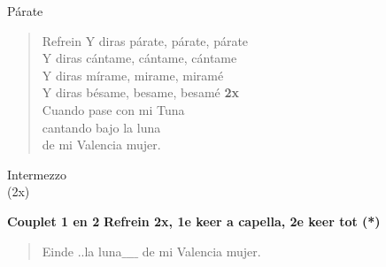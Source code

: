 \begin{song}{Párate}
\begin{verse}{Refrein}
 \hspace{1em} Y diras párate, párate, párate\\
 \hspace{1em} Y diras cántame, cántame, cántame\\
 \hspace{1em} Y diras mírame, mirame, miramé\\
 \hspace{1em} Y diras bésame, besame, besamé \hspace{1em} \textbf{2x}\\
Cuando pase con mi Tuna\\
cantando bajo \chord{(*)} la luna\\
de mi Valencia mujer.
\end{verse}
\clearpage

\begin{instrumental}{Intermezzo}
  \measure{} \measure*{}\\
    (2x)
\end{instrumental}

\textbf{Couplet 1 en 2}
\textbf{Refrein 2x, 1e keer a capella, 2e keer tot (*)}

\begin{verse}{Einde}
\chord{(*)}..la luna$\_\_\_$$\_$ de mi Valencia mujer.  \hspace{0.8em} \hspace{1.3em} 
\end{verse}
\end{song}
